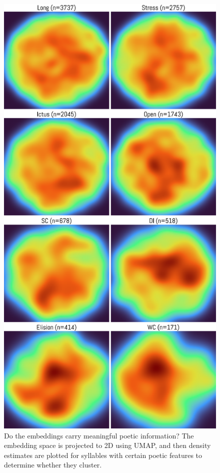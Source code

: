 \documentclass[
    twocolumn,
    hf,
]{ceurart}
\begin{document}
\begin{figure}
    \includegraphics[width=\linewidth]{figures/embedding_densities.pdf}
    \caption{Do the embeddings carry meaningful poetic information? The
        embedding space is projected to 2D using UMAP, and then density
        estimates are plotted for syllables with certain poetic features to
        determine whether they cluster.}
    \label{fig:emb_dense}
\end{figure}
\end{document}

